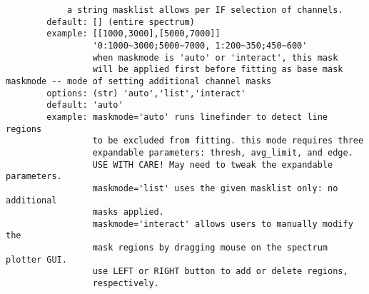 \begin{verbatim}
            a string masklist allows per IF selection of channels.
        default: [] (entire spectrum)
        example: [[1000,3000],[5000,7000]]
                 '0:1000~3000;5000~7000, 1:200~350;450~600'
                 when maskmode is 'auto' or 'interact', this mask 
                 will be applied first before fitting as base mask
maskmode -- mode of setting additional channel masks
        options: (str) 'auto','list','interact'
        default: 'auto'
        example: maskmode='auto' runs linefinder to detect line regions 
                 to be excluded from fitting. this mode requires three 
                 expandable parameters: thresh, avg_limit, and edge.
                 USE WITH CARE! May need to tweak the expandable parameters.
                 maskmode='list' uses the given masklist only: no additional 
                 masks applied.
                 maskmode='interact' allows users to manually modify the 
                 mask regions by dragging mouse on the spectrum plotter GUI.
                 use LEFT or RIGHT button to add or delete regions, 
                 respectively.
       

\end{verbatim}

